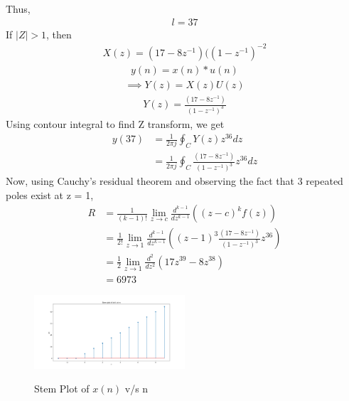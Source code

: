 \documentclass[journal,12pt,twocolumn]{IEEEtran}
\theoremstyle{remark}
\begin{document}
Thus,
\begin{align}{l = 37}\end{align}
If $|Z|>1$, then
\begin{align}\label{8}X(z) = (17-8z^{-1})({(1-z^{-1})}^{-2}\end{align}
\begin{align}y(n) = x(n) * u(n)\end{align}
\begin{align}\implies Y(z) = X(z)U(z)\end{align}
\begin{align}Y(z) = \frac{(17-8z^{-1})}{(1-z^{-1})^{3}}\end{align}
\bigskip
Using contour integral to find Z transform, we get
\begin{align}
    y(37) &= \frac{1}{2\pi j} \oint _C Y(z)z^{36}dz\\
    &= \frac{1}{2\pi j} \oint _C \frac{(17-8z^{-1})}{(1-z^{-1})^{3}}z^{36}dz
\end{align}
Now, using Cauchy's residual theorem and observing the fact that 3 repeated poles exist at z = 1, 
\begin{align}
    R &= \frac{1}{(k-1)!}\lim_{z \to c}\frac{d^{k-1}}{dz^{k-1}}((z-c)^kf(z))\\
    &= \frac{1}{2!}\lim_{z \to 1}\frac{d^{k-1}}{dz^{k-1}}((z-1)^3\frac{(17-8z^{-1})}{(1-z^{-1})^{3}}z^{36})\\
    &=\frac{1}{2}\lim_{z \to 1}\frac{d^2}{dz^2}(17z^{39} - 8z^{38})\\
    &= 6973
\end{align}
\begin{figure}[h]
\renewcommand\thefigure{1}
    \caption{Stem Plot of $x(n)$ v/s n}
    \includegraphics[width=0.5\textwidth]{figs/x(n)_plot.png}
    \label{fig:stem-plot}
\end{figure}
\end{document}
